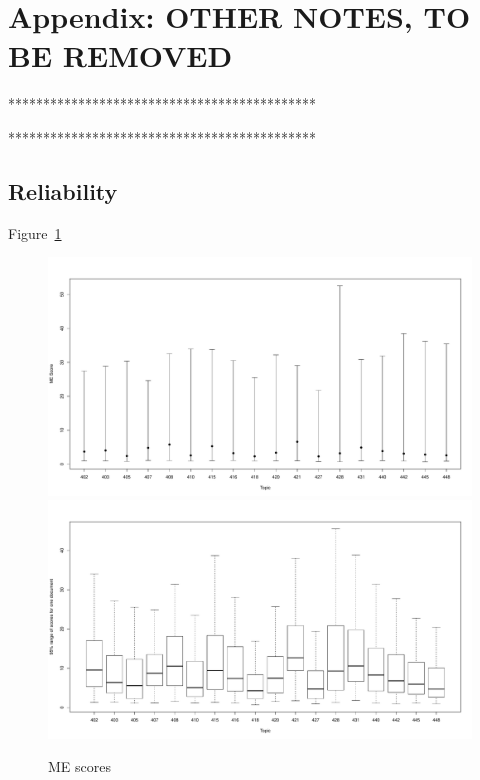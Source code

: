 \section{Appendix: OTHER NOTES,  TO BE REMOVED}


********************************************


********************************************

\subsection{Reliability}
\label{sec:reliability}

Figure~\ref{fig:ME-scores}

\begin{figure}[tb]
  \centering
  \includegraphics[width=\linewidth]{figs/byTopic.pdf}
  \includegraphics[width=\linewidth]{figs/byTopic_docRanges.pdf}
  \caption{ME scores }
  \label{fig:ME-scores}
\end{figure}



